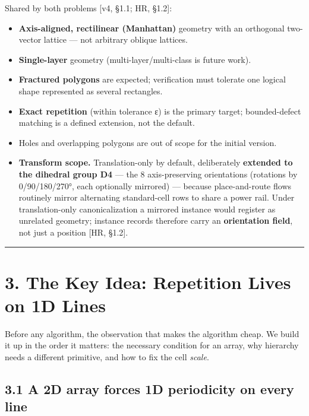 \documentclass[
  11pt,
]{article}
\providecommand{\tightlist}{%
  \setlength{\itemsep}{0pt}\setlength{\parskip}{0pt}}
\begin{document}
Shared by both problems {[}v4, §1.1; HR, §1.2{]}:

\begin{itemize}
\tightlist
\item
  \textbf{Axis-aligned, rectilinear (Manhattan)} geometry with an
  orthogonal two-vector lattice --- not arbitrary oblique lattices.
\item
  \textbf{Single-layer} geometry (multi-layer/multi-class is future
  work).
\item
  \textbf{Fractured polygons} are expected; verification must tolerate
  one logical shape represented as several rectangles.
\item
  \textbf{Exact repetition} (within tolerance ε) is the primary target;
  bounded-defect matching is a defined extension, not the default.
\item
  Holes and overlapping polygons are out of scope for the initial
  version.
\item
  \textbf{Transform scope.} Translation-only by default, deliberately
  \textbf{extended to the dihedral group D4} --- the 8 axis-preserving
  orientations (rotations by 0/90/180/270°, each optionally mirrored)
  --- because place-and-route flows routinely mirror alternating
  standard-cell rows to share a power rail. Under translation-only
  canonicalization a mirrored instance would register as unrelated
  geometry; instance records therefore carry an \textbf{orientation
  field}, not just a position {[}HR, §1.2{]}.
\end{itemize}

\begin{center}\rule{0.5\linewidth}{0.5pt}\end{center}

\section{3. The Key Idea: Repetition Lives on 1D
Lines}\label{the-key-idea-repetition-lives-on-1d-lines}

Before any algorithm, the observation that makes the algorithm cheap. We
build it up in the order it matters: the necessary condition for an
array, why hierarchy needs a different primitive, and how to fix the
cell \emph{scale}.

\subsection{3.1 A 2D array forces 1D periodicity on every
line}\label{a-2d-array-forces-1d-periodicity-on-every-line}
\end{document}
